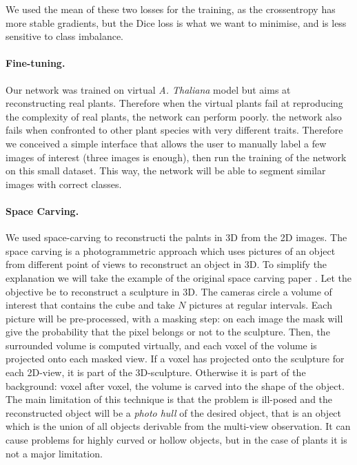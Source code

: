 We used the mean of these two losses for the training, as the
crossentropy has more stable gradients, but the Dice loss is what we
want to minimise, and is less sensitive to class imbalance.


\paragraph{Fine-tuning.} Our network was trained on virtual \emph{A.
Thaliana} model but aims at reconstructing real plants. Therefore when
the virtual plants fail at reproducing the complexity of real plants,
the network can perform poorly. the network also fails when confronted
to other plant species with very different traits. Therefore we
conceived a simple interface that allows the user to manually label a
few images of interest (three images is enough), then run the training
of the network on this small dataset. This way, the network will be
able to segment similar images with correct classes.


\paragraph{Space Carving.} We used space-carving to reconstructi
the palnts in 3D from the 2D images. The space carving
\cite{kutulakos_theory_1999} is a photogrammetric approach which uses
pictures of an object from different point of views to reconstruct
an object in 3D. To simplify the explanation we will take the example
of the original space carving paper \cite{kutulakos_theory_1999}. Let
the objective be to reconstruct a sculpture in 3D. The cameras circle
a volume of interest that contains the cube and take $N$ pictures
at regular intervals. Each picture will be pre-processed, with a
masking step: on each image the mask will give the probability that
the pixel belongs or not to the sculpture. Then, the surrounded volume
is computed virtually, and each voxel of the volume is projected onto
each masked view. If a voxel has projected onto the sculpture for each
2D-view, it is part of the 3D-sculpture. Otherwise it is part of the
background: voxel after voxel, the volume is carved into the shape of
the object. The main limitation of this technique is that the problem
is ill-posed and the reconstructed object will be a \emph{photo
hull} \cite{kutulakos_theory_1999} of the desired object, that is an
object which is the union of all objects derivable from the multi-view
observation. It can cause problems for highly curved or hollow objects,
but in the case of plants it is not a major limitation.

